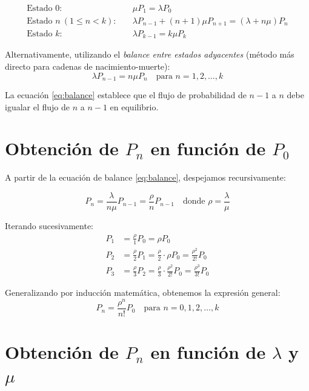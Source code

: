 \documentclass[12pt,a4paper]{article}
\theoremstyle{definition}
\begin{document}
\begin{align}
    \text{Estado } 0: &\quad \mu P_1 = \lambda P_0 \label{eq:estado0}\\
    \text{Estado } n \ (1 \leq n < k): &\quad \lambda P_{n-1} + (n+1)\mu P_{n+1} = (\lambda + n\mu)P_n \label{eq:estadon}\\
    \text{Estado } k: &\quad \lambda P_{k-1} = k\mu P_k \label{eq:estadok}
\end{align}

Alternativamente, utilizando el \textit{balance entre estados adyacentes} (método más directo para cadenas de nacimiento-muerte):
\begin{equation}
    \lambda P_{n-1} = n\mu P_n \quad \text{para } n = 1, 2, \ldots, k
    \label{eq:balance}
\end{equation}

La ecuación \eqref{eq:balance} establece que el flujo de probabilidad de $n-1$ a $n$ debe igualar el flujo de $n$ a $n-1$ en equilibrio.

\section{Obtención de $P_n$ en función de $P_0$}

A partir de la ecuación de balance \eqref{eq:balance}, despejamos recursivamente:

\begin{equation}
    P_n = \frac{\lambda}{n\mu} P_{n-1} = \frac{\rho}{n} P_{n-1} \quad \text{donde } \rho = \frac{\lambda}{\mu}
\end{equation}

Iterando sucesivamente:
\begin{align}
    P_1 &= \frac{\rho}{1} P_0 = \rho P_0 \\
    P_2 &= \frac{\rho}{2} P_1 = \frac{\rho}{2} \cdot \rho P_0 = \frac{\rho^2}{2!} P_0 \\
    P_3 &= \frac{\rho}{3} P_2 = \frac{\rho}{3} \cdot \frac{\rho^2}{2!} P_0 = \frac{\rho^3}{3!} P_0
\end{align}

Generalizando por inducción matemática, obtenemos la expresión general:
\begin{equation}
    \boxed{P_n = \frac{\rho^n}{n!} P_0 \quad \text{para } n = 0, 1, 2, \ldots, k}
    \label{eq:pn_po}
\end{equation}

\section{Obtención de $P_n$ en función de $\lambda$ y $\mu$}
\end{document}
